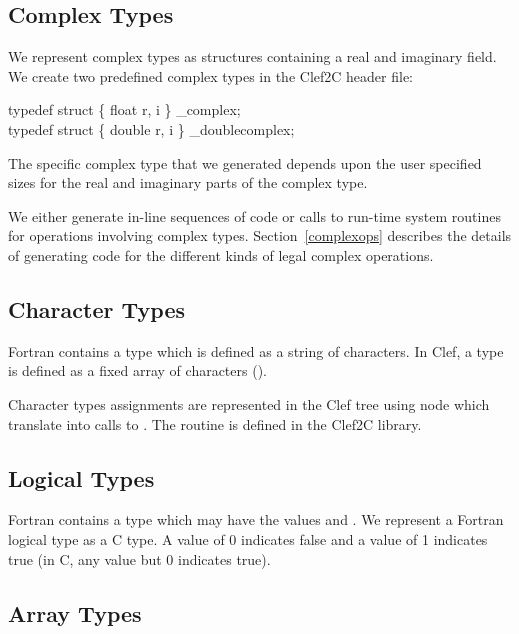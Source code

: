 \subsection{Complex Types}

We represent complex types as structures containing
a real and imaginary field.  We create two predefined complex 
types in the Clef2C header file:
\begin{codeseq}
typedef struct \{ float r, i \} \_complex; \\
typedef struct \{ double r, i \} \_doublecomplex;
\end{codeseq}

The specific complex type that we generated depends upon the user
specified sizes for the real and imaginary parts of the complex type.

We either generate in-line sequences of code or calls to run-time
system routines for operations involving complex types.
Section~\ref{complexops} describes the details of generating code for
the different kinds of legal complex operations.

\subsection{Character Types}

Fortran contains a  type which is defined as a string
of characters.  In Clef, a  type is defined as a fixed
array of characters (\ie {}).

Character types assignments are represented in the Clef tree using
 node which translate into calls to
.  The routine 
is defined in the Clef2C library.

\subsection{Logical Types}

Fortran contains a  type which may have the values
 and .  We represent a Fortran logical type
as a C  type.  A value of 0 indicates false and a value
of 1 indicates true (in C, any value but 0 indicates true).

\subsection{Array Types}

